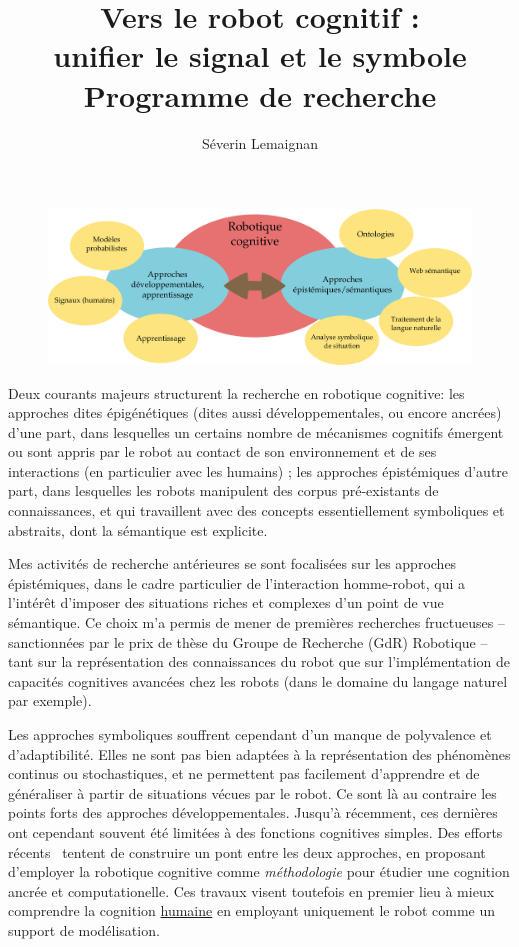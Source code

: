 \documentclass[a4paper]{article}
\title{Vers le robot cognitif :\\ unifier le signal et le symbole\\ 
    {\large Programme de recherche}}
\author{Séverin Lemaignan}
\date{}
\begin{document}
\maketitle

\begin{figure}
    \centering
    \includegraphics[width=1.0\linewidth]{place}
    \caption{}
    \label{place}
\end{figure}


Deux courants majeurs structurent la recherche en robotique cognitive: les
approches dites épigénétiques (dites aussi développementales, ou encore ancrées) d'une
part, dans lesquelles un certains nombre de mécanismes cognitifs émergent ou
sont appris par le robot au contact de son environnement et de ses interactions
(en particulier avec les humains) ; les approches épistémiques d'autre part,
dans lesquelles les robots manipulent des corpus pré-existants de connaissances,
et qui travaillent avec des concepts essentiellement symboliques et abstraits,
dont la sémantique est explicite.

Mes activités de recherche antérieures se sont focalisées sur les approches
épistémiques, dans le cadre particulier de l'interaction homme-robot, qui a
l'intérêt d'imposer des situations riches et complexes d'un point de vue
sémantique. Ce choix m'a permis de mener de premières recherches fructueuses --
sanctionnées par le prix de thèse du Groupe de Recherche (GdR) Robotique -- tant
sur la représentation des connaissances du robot que sur l'implémentation de
capacités cognitives avancées chez les robots (dans le domaine du langage
naturel par exemple). 

Les approches symboliques souffrent cependant d'un manque de polyvalence et
d'adaptibilité. Elles ne sont pas bien adaptées à la représentation des
phénomènes continus ou stochastiques, et ne permettent pas facilement
d'apprendre et de généraliser à partir de situations vécues par le robot. Ce
sont là au contraire les points forts des approches développementales.  Jusqu'à
récemment, ces dernières ont cependant souvent été limitées à des fonctions
cognitives simples. Des efforts récents~\cite{morse2010epigenetic,
pezzulo2012computational} tentent de construire un pont entre les deux
approches, en proposant d'employer la robotique cognitive comme
\emph{méthodologie} pour étudier une cognition ancrée et computationelle. Ces
travaux visent toutefois en premier lieu à mieux comprendre la cognition
\underline{humaine} en employant uniquement le robot comme un support de
modélisation.
\end{document}
